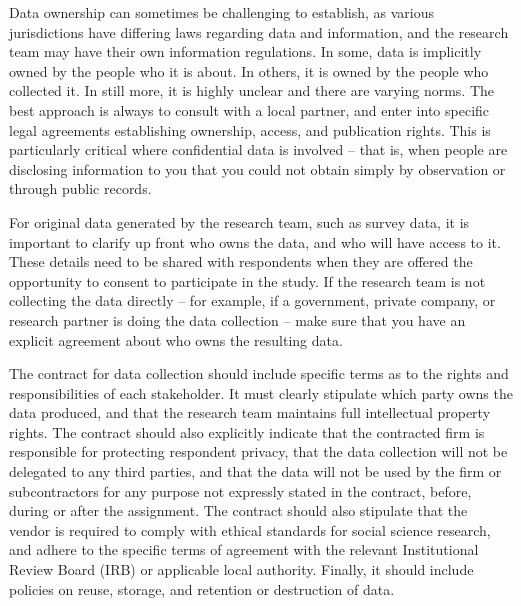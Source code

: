 Data ownership
can sometimes be challenging to establish,
as various jurisdictions have differing laws regarding data and information,
and the research team may have their own information regulations.
In some, data is implicitly owned by the people who it is about.
In others, it is owned by the people who collected it.
In still more, it is highly unclear and there are varying norms.
The best approach is always to consult with a local partner,
and enter into specific legal agreements establishing ownership,
access, and publication rights.
This is particularly critical where confidential data is involved
-- that is, when people are disclosing information to you
that you could not obtain simply by observation or through public records.

For original data generated by the research team, such as survey data,
it is important to clarify up front who owns the data,
and who will have access to it.
These details need to be shared with respondents when they are offered the opportunity
to consent to participate in the study.
If the research team is not collecting the data directly --
for example, if a government, private company, or research partner is doing the data collection --
make sure that you have an explicit agreement
about who owns the resulting data.

The contract for data collection should include specific terms
as to the rights and responsibilities of each stakeholder.
It must clearly stipulate which party owns the data produced,
and that the research team maintains full intellectual property rights.
The contract should also explicitly indicate that the contracted firm
is responsible for protecting respondent privacy,
that the data collection will not be delegated to any third parties,
and that the data will not be used by the firm or subcontractors for any purpose not expressly stated in the contract,
before, during or after the assignment.
The contract should also stipulate that the vendor is required to comply with
ethical standards for social science research,
and adhere to the specific terms of agreement with the relevant
Institutional Review Board (IRB)
or applicable local authority.
Finally, it should include policies on reuse, storage, and retention or destruction of data.

